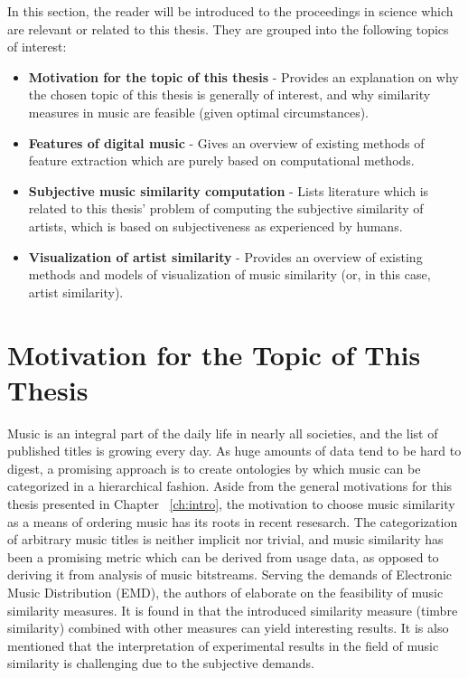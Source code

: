 In this section, the reader will be introduced to the proceedings in science which are
relevant or related to this thesis. They are grouped into the following topics of interest:

\begin{itemize}
	\item \textbf {Motivation for the topic of this thesis} - Provides an explanation on why the chosen topic of this thesis is generally of interest, and why similarity measures in music are feasible (given optimal circumstances).
	\item \textbf {Features of digital music} - Gives an overview of existing methods of feature extraction which are purely based on computational methods.
	\item \textbf {Subjective music similarity computation} - Lists literature which is related to this thesis' problem of computing the subjective similarity of artists, which is based on subjectiveness as experienced by humans.
	\item \textbf {Visualization of artist similarity} - Provides an overview of existing methods and models of visualization of music similarity (or, in this case, artist similarity).
\end{itemize}

\section{Motivation for the Topic of This Thesis}

Music is an integral part of the daily life in nearly all societies, and the list of published titles is growing every day. As huge amounts of data tend to be hard to digest, a promising approach is to create ontologies by which music can be categorized in a hierarchical fashion. Aside from the general motivations for this thesis presented in Chapter ~\ref{ch:intro}, the motivation to choose music similarity as a means of ordering music has its roots in recent resesarch. The categorization of arbitrary music titles is neither implicit nor trivial, and music similarity has been a promising metric which can be derived from usage data, as opposed to deriving it from analysis of music bitstreams. Serving the demands of Electronic Music Distribution (EMD), the authors of \cite{pachet:02g} elaborate on the feasibility of music similarity measures. It is found in \cite{pachet:02g} that the introduced similarity measure (timbre similarity) combined with other measures can yield interesting results. It is also mentioned that the interpretation of experimental results in the field of music similarity is challenging due to the subjective demands. 

